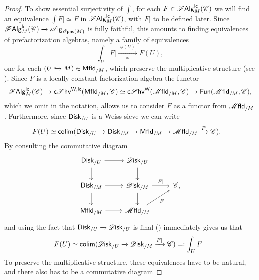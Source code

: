 \documentclass[../text]{subfiles}
\begin{document}
\begin{proof}
    To show essential surjectivity of $\int$, for each $F \in \mathscr{F} \mathsf{Alg}^{\mathsf{lc}}_M (\mathscr{C})$ we will find an equivalence $\int F| \simeq F$ in $\mathscr{F} \mathsf{Alg}^{\mathsf{lc}}_M (\mathscr{C})$, with $F|$ to be defined later. Since $\lcfa_M (\catC) \xrightarrow{} \alg{\opens(M)}$ is fully faithful, this amounts to finding equivalences of prefactorization algebras, namely a family of equivalences
    \begin{equation}
        \int_U F| \xrightarrow[\simeq]{\ \ \phi (U) \ \ } F(U),
    \end{equation}
    one for each $(U \xhookrightarrow{} M) \in \mfld[r]_{/M}$, which preserve the multiplicative structure (see ). Since $F$ is a locally constant factorization algebra the functor
    \begin{equation}
        \lcfa_M (\catC) \xrightarrow{} \csheaves[W, lc](\mfld[r]_{/M}, \catC) \simeq \csheaves[W](\mfld_{/M}, \catC) \xrightarrow{} \mathsf{Fun}(\mfld_{/M}, \catC),
    \end{equation}
    which we omit in the notation, allows us to consider $F$ as a functor from $\mfld_{/M}$. Furthermore, since $\disk[r]_{/U}$ is a Weiss sieve we can write
    \begin{align}
        F(U) &\simeq \mathsf{colim} (\disk[r]_{/U} \xrightarrow{} \disk[r]_{/M} \xrightarrow{} \mfld[r]_{/M} \xrightarrow{} \mfld_{/M} \xrightarrow{F} \catC).
    \end{align}
    By consulting the commutative diagram
    \begin{equation}
        \begin{tikzcd}
            \disk[r]_{/U} \arrow[d] \arrow[r] & \disk_{/U} \arrow[d] & \\
            \disk[r]_{/M} \arrow[d] \arrow[r] & \disk_{/M} \arrow[d] \arrow[r, "F|"] & \catC, \\
            \mfld[r]_{/M} \arrow[r] & \mfld_{/M} \arrow[ru, "F"'] &  
        \end{tikzcd}
    \end{equation}
    and using the fact that $\disk[r]_{/U} \xrightarrow{} \disk_{/U}$ is final (\cite[prop.2.22]{aft_fhstrat}) immediately gives us that
    \begin{equation}
        F(U) \simeq \mathsf{colim} (\disk_{/U} \xrightarrow{} \disk_{/M} \xrightarrow{F|} \catC) =: \int_U F|.
    \end{equation}
    To preserve the multiplicative structure, these equivalences have to be natural, and there also has to be a commutative diagram

\end{proof}
\end{document}
